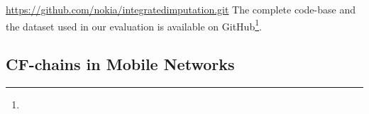 				\urldef{\footurl}\url{https://github.com/nokia/integratedimputation.git}
				The complete code-base and the dataset used in our evaluation is available on GitHub\footnote{\footurl}.
		
			\subsection{CF-chains in Mobile Networks}
			
				
				
				
				
